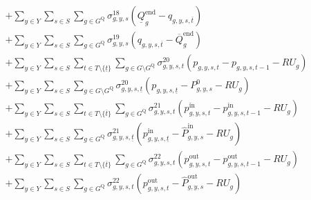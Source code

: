 \documentclass{article}
\newcommand{\sGenerators}{G}
\newcommand{\sStorage}{G^{\mathrm{Q}}}
\newcommand{\sYears}{Y}
\newcommand{\sScenarios}{S}
\newcommand{\sIntervals}{T}
\newcommand{\iGenerator}{g}
\newcommand{\iYear}{y}
\newcommand{\iScenario}{s}
\newcommand{\iInterval}{t}
\newcommand{\iIntervalTerminal}{\overline{\iInterval}}
\newcommand{\iIntervalStart}{\underline{\iInterval}}
\newcommand{\cRampRateUp}[1][\iGenerator]{RU_{#1}}
\newcommand{\cStorageUnitEnergyIntervalEndMax}[1][\iGenerator]{\overline{Q}^{\mathrm{end}}_{#1}}
\newcommand{\cStorageUnitEnergyIntervalEndMin}[1][\iGenerator]{\underline{Q}^{\mathrm{end}}_{#1}}
\newcommand{\cPowerInitial}[1][\iGenerator,\iYear,\iScenario]{P_{#1}^{0}}
\newcommand{\cPowerOutInitial}[1][\iGenerator,\iYear,\iScenario]{\hat{P}_{#1}^{\mathrm{out}}}
\newcommand{\cPowerInInitial}[1][\iGenerator,\iYear,\iScenario]{\hat{P}_{#1}^{\mathrm{in}}}
\newcommand{\vPower}[1][\iGenerator,\iYear,\iScenario,\iInterval]{p_{#1}}
\newcommand{\vPowerIn}[1][\iGenerator,\iYear,\iScenario,\iInterval]{p^{\mathrm{in}}_{#1}}
\newcommand{\vPowerOut}[1][\iGenerator,\iYear,\iScenario,\iInterval]{p^{\mathrm{out}}_{#1}}
\newcommand{\vStorageUnitEnergy}[1][\iGenerator,\iYear,\iScenario,\iInterval]{q_{#1}}
\newcommand{\dMinStorageEnergyIntervalEnd}[1][\iGenerator,\iYear,\iScenario]{\sigma_{#1}^{18}}
\newcommand{\dMaxStorageEnergyIntervalEnd}[1][\iGenerator,\iYear,\iScenario]{\sigma_{#1}^{19}}
\newcommand{\dRampRateUp}[1][\iGenerator,\iYear,\iScenario,\iInterval]{\sigma_{#1}^{20}}
\newcommand{\dRampRateUpStorageCharging}[1][\iGenerator,\iYear,\iScenario,\iInterval]{\sigma_{#1}^{21}}
\newcommand{\dRampRateUpStorageDischarging}[1][\iGenerator,\iYear,\iScenario,\iInterval]{\sigma_{#1}^{22}}
\begin{document}
\begin{align}
		& + \sum\limits_{\iYear \in \sYears}\sum\limits_{\iScenario \in \sScenarios} \sum\limits_{\iGenerator \in \sStorage} \dMinStorageEnergyIntervalEnd \left(\cStorageUnitEnergyIntervalEndMin - \vStorageUnitEnergy[\iGenerator,\iYear,\iScenario,\iIntervalTerminal]\right)\\
		& + \sum\limits_{\iYear \in \sYears}\sum\limits_{\iScenario \in \sScenarios} \sum\limits_{\iGenerator \in \sStorage} \dMaxStorageEnergyIntervalEnd \left(\vStorageUnitEnergy[\iGenerator,\iYear,\iScenario,\iIntervalTerminal] - \cStorageUnitEnergyIntervalEndMax\right)\\
		& + \sum\limits_{\iYear \in \sYears}\sum\limits_{\iScenario \in \sScenarios}\sum\limits_{\iInterval \in \sIntervals \setminus \{\iIntervalStart\}} \sum\limits_{\iGenerator \in \sGenerators \setminus \sStorage} \dRampRateUp \left(\vPower - \vPower[\iGenerator,\iYear,\iScenario,\iInterval-1] - \cRampRateUp\right)\\
		& + \sum\limits_{\iYear \in \sYears}\sum\limits_{\iScenario \in \sScenarios} \sum\limits_{\iGenerator \in \sGenerators \setminus \sStorage} \dRampRateUp[\iGenerator,\iYear,\iScenario,\iIntervalStart] \left(\vPower[\iGenerator,\iYear,\iScenario,\iIntervalStart] - \cPowerInitial - \cRampRateUp\right)\\
		& +  \sum\limits_{\iYear \in \sYears}\sum\limits_{\iScenario \in \sScenarios} \sum\limits_{\iInterval \in \sIntervals \setminus \{\iIntervalTerminal\}} \sum\limits_{\iGenerator \in \sStorage} \dRampRateUpStorageCharging \left(\vPowerIn - \vPowerIn[\iGenerator,\iYear,\iScenario,\iInterval-1] - \cRampRateUp\right) \\
		& +  \sum\limits_{\iYear \in \sYears}\sum\limits_{\iScenario \in \sScenarios} \sum\limits_{\iGenerator \in \sStorage} \dRampRateUpStorageCharging[\iGenerator,\iYear,\iScenario,\iIntervalStart] \left(\vPowerIn[\iGenerator,\iYear,\iScenario,\iIntervalStart] - \cPowerInInitial - \cRampRateUp\right) \\
		& +  \sum\limits_{\iYear \in \sYears}\sum\limits_{\iScenario \in \sScenarios} \sum\limits_{\iInterval \in \sIntervals \setminus \{\iIntervalTerminal\}} \sum\limits_{\iGenerator \in \sStorage} \dRampRateUpStorageDischarging \left(\vPowerOut - \vPowerOut[\iGenerator,\iYear,\iScenario,\iInterval-1] - \cRampRateUp\right) \\
		& +  \sum\limits_{\iYear \in \sYears}\sum\limits_{\iScenario \in \sScenarios} \sum\limits_{\iGenerator \in \sStorage} \dRampRateUpStorageDischarging \left(\vPowerOut - \cPowerOutInitial - \cRampRateUp\right) \\

\end{align}
\end{document}
